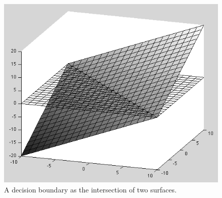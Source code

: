 \begin{figure}[h]
\centering
\includegraphics[scale=.4]{./images/decisionLinePlanes.png}
\caption{A decision boundary as the intersection of two surfaces.}
\label{decisionLineSurface}
\end{figure}

